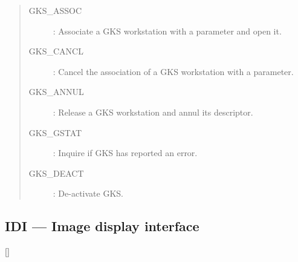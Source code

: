 \begin{quote}
\begin{description}
\item [GKS\_ASSOC] : Associate a GKS workstation with a parameter and open it.
\item [GKS\_CANCL] : Cancel the association of a GKS workstation with a parameter.
\item [GKS\_ANNUL] : Release a GKS workstation and annul its descriptor.
\item [GKS\_GSTAT] : Inquire if GKS has reported an error.
\item [GKS\_DEACT] : De-activate GKS.
\end{description}
\end{quote}

\newpage

\subsection{IDI --- Image display interface} 

\vspace{-9mm}

\hfill []

\vspace{2mm}

